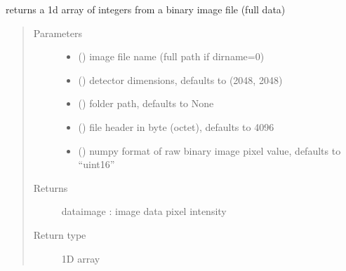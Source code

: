 \documentclass[letterpaper,10pt,english]{sphinxmanual}
\begin{document}
\begin{fulllineitems}
\label{\detokenize{PeakSearch:LaueTools.readmccd.readoneimage}}
returns a 1d array of integers from a binary image file (full data)
\begin{quote}\begin{description}
\item[{Parameters}] \leavevmode\begin{itemize}
\item {} 
 () \textendash{} image file name (full path if dirname=0)

\item {} 
 (\sphinxstyleliteralemphasis{\sphinxupquote{, }}) \textendash{} detector dimensions, defaults to (2048, 2048)

\item {} 
 (\sphinxstyleliteralemphasis{\sphinxupquote{, }}) \textendash{} folder path, defaults to None

\item {} 
 (\sphinxstyleliteralemphasis{\sphinxupquote{, }}) \textendash{} file header in byte (octet), defaults to 4096

\item {} 
 (\sphinxstyleliteralemphasis{\sphinxupquote{, }}) \textendash{} numpy format of raw binary image pixel value, defaults to “uint16”

\end{itemize}

\item[{Returns}] \leavevmode
dataimage : image data pixel intensity

\item[{Return type}] \leavevmode
1D array

\end{description}\end{quote}

\end{fulllineitems}
\end{document}
